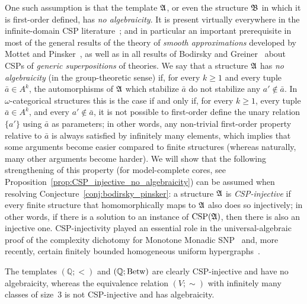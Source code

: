  One such assumption is that the template $\mathfrak{A}$, or even the structure $\mathfrak{B}$ in which it is first-order defined, has \emph{no algebraicity}. It is present virtually everywhere in the infinite-domain CSP literature~\cite{MMSNP-Journal}; and in particular an important prerequisite in most of the general results of the theory of \emph{smooth approximations}  developed by Mottet and Pinsker~\cite{mottet2024smooth}, as well as in all results of Bodirsky and Greiner~\cite{bodirsky2020complexity,bodirsky2021tractable} about CSPs of \emph{generic superpositions} of theories. We say that a structure $\mathfrak{A}$ has \emph{no algebraicity} (in the group-theoretic sense) if, for every $k\geq 1$ and every tuple $\bar{a}\in A^k$, the automorphisms of $\mathfrak{A}$ which stabilize $\bar{a}$ do not stabilize any $a'\notin \bar{a}$.
%
In $\omega$-categorical structures this is the case if and only if, for every $k\geq 1$, every tuple $\bar{a}\in A^k$, and every $a'\notin \bar{a}$, it is not possible to first-order define the unary relation $\{a'\}$ using $\bar{a}$ as parameters; %
in other words, any non-trivial first-order property  relative to $\bar{a}$ is always satisfied by infinitely many elements, which implies that some arguments become easier compared to finite structures (whereas naturally, many other arguments become harder).
% 
We will show that the following  strengthening of this property (for model-complete cores, see Proposition~\ref{prop:CSP_injective_no_algebraicity}) can be assumed when resolving Conjecture~\ref{conj:bodirsky_pinsker}: a structure $\mathfrak{A}$ is \emph{CSP-injective} if every finite structure that homomorphically maps to $\mathfrak{A}$ also does so injectively; in other words, if there is a solution to an instance of $\mathrm{CSP}(\mathfrak{A})$, then there is also an injective one. CSP-injectivity played an essential role in the universal-algebraic proof of the complexity dichotomy for Monotone Monadic SNP~\cite{MMSNP-Journal} and, more recently, certain finitely bounded homogeneous uniform hypergraphs~\cite{mottet_et_al:LIPIcs.ICALP.2024.148}. 
%
\begin{example} \label{ex:properties_of_q2}
The templates $(\mathbb Q;<)$ and $(\mathbb Q;\operatorname{Betw})$ are clearly CSP-injective and have no algebraicity, whereas the equivalence relation $(V;\sim)$ with infinitely many classes of size~3 is not CSP-injective and has algebraicity.    
\end{example} 

